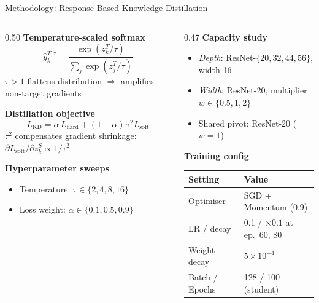 \documentclass[english, hyperref={colorlinks,citecolor=blue,linkcolor=blue,urlcolor=blue}, handout]{beamer}
\begin{document}
\begin{frame}{Methodology: Response-Based Knowledge Distillation}
  \begin{columns}[t]
    \begin{column}{0.50\textwidth}
      \textbf{Temperature-scaled softmax}
      \[
        \hat{y}_k^{T,\tau} = \frac{\exp(z_k^T/\tau)}{\textstyle\sum_j \exp(z_j^T/\tau)}
      \]
      {\small $\tau{>}1$ flattens distribution $\Rightarrow$ amplifies non-target gradients}

      \vspace{0.4em}
      \textbf{Distillation objective}
      \[
        \boxed{L_{\mathrm{KD}}
          = \alpha\,L_{\mathrm{hard}}
          + (1{-}\alpha)\,\tau^2 L_{\mathrm{soft}}}
      \]
      {\small $\tau^2$ compensates gradient shrinkage: $\partial L_{\mathrm{soft}}/\partial z_k^S \propto 1/\tau^2$}

      \vspace{0.4em}
      \textbf{Hyperparameter sweeps}
      \begin{itemize}\small
        \item Temperature: $\tau \in \{2, 4, 8, 16\}$
        \item Loss weight: $\alpha \in \{0.1, 0.5, 0.9\}$
      \end{itemize}
    \end{column}
    \begin{column}{0.47\textwidth}
      \textbf{Capacity study}\\[0.2em]
      \begin{itemize}\small
        \item \textit{Depth}: ResNet-$\{20,32,44,56\}$, width 16
        \item \textit{Width}: ResNet-20, multiplier $w\in\{0.5,1,2\}$
        \item Shared pivot: ResNet-20 ($w{=}1$)
      \end{itemize}

      \vspace{0.5em}
      \textbf{Training config}
      \begin{center}\tiny
        \begin{tabular}{ll}
          \toprule
          Setting & Value\\
          \midrule
          Optimiser      & SGD + Momentum (0.9)\\
          LR / decay     & 0.1 / ${\times}0.1$ at ep.\ 60, 80\\
          Weight decay   & $5{\times}10^{-4}$\\
          Batch / Epochs & 128 / 100 (student)\\
          \bottomrule
        \end{tabular}
      \end{center}
    \end{column}
  \end{columns}
\end{frame}
\end{document}
